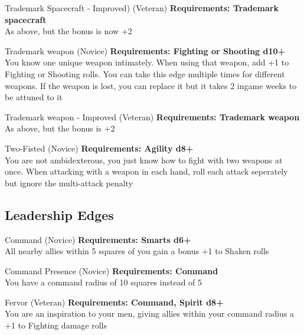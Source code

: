 \begin{multicols}{2}
\begin{genericsection}{Trademark Spacecraft - Improved) (Veteran)}
\textbf{Requirements: Trademark spacecraft}\\
As above, but the bonus is now +2
\end{genericsection}

\begin{genericsection}{Trademark weapon (Novice)}
\textbf{Requirements: Fighting or Shooting d10+}\\
You know one unique weapon intimately. When using that weapon, add +1 to Fighting or Shooting rolls. You can take this edge multiple times for different weapons. If the weapon is lost, you can replace it but it takes 2 ingame weeks to be attuned to it
\end{genericsection}

\begin{genericsection}{Trademark weapon - Improved (Veteran)}
\textbf{Requirements: Trademark weapon}\\
As above, but the bonus is +2
\end{genericsection}

\begin{genericsection}{Two-Fisted (Novice)}
\textbf{Requirements: Agility d8+}\\
You are not ambidexterous, you just know how to fight with two weapons at once. When attacking with a weapon in each hand, roll each attack seperately but ignore the multi-attack penalty
\end{genericsection}

%
%
\subsection{Leadership Edges}

\begin{genericsection}{Command (Novice)}
\textbf{Requirements: Smarts d6+}\\
All nearby allies within 5 squares of you gain a bonus +1 to Shaken rolls
\end{genericsection}

\begin{genericsection}{Command Presence (Novice)}
\textbf{Requirements: Command}\\
You have a command radius of 10 squares instead of 5
\end{genericsection}

\begin{genericsection}{Fervor (Veteran)}
\textbf{Requirements: Command, Spirit d8+}\\
You are an inspiration to your men, giving allies within your command radius a +1 to Fighting damage rolls
\end{genericsection}


\end{multicols}
